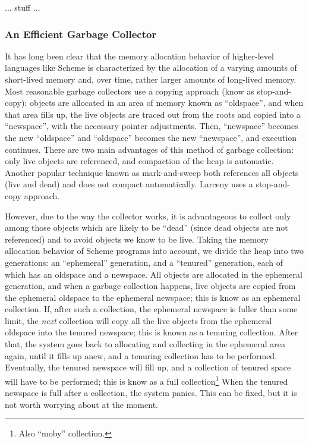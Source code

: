 ... stuff ...

\subsubsection{An Efficient Garbage Collector}

It has long been clear that the memory allocation behavior of
higher-level languages like Scheme is characterized by the allocation
of a varying amounts of short-lived memory and, over time, rather
larger amounts of long-lived memory. Most reasonable garbage
collectors use a copying approach (know as stop-and-copy): objects are
allocated in an area of memory known as ``oldspace'', and when that
area fills up, the live objects are traced out from the roots and
copied into a ``newspace'', with the necessary pointer adjustments.
Then, ``newspace'' becomes the new ``oldspace'' and ``oldspace''
becomes the new ``newspace'', and execution continues. There are two
main advantages of this method of garbage collection: only live
objects are referenced, and compaction of the heap is automatic.
Another popular technique known as mark-and-sweep both references all
objects (live and dead) and does not compact automatically.
Larceny uses a stop-and-copy approach.

However, due to the way the collector works, it is advantageous to
collect only among those objects which are likely to be ``dead''
(since dead objects are not referenced) and to avoid objects we know
to be live. Taking the memory allocation behavior of Scheme programs
into account, we divide the heap into two generations: an
``ephemeral'' generation, and a ``tenured'' generation, each of which
has an oldspace and a newspace. All objects are allocated in the
ephemeral generation, and when a garbage collection happens, live
objects are copied from the ephemeral oldspace to the ephemeral
newspace; this is know as an ephemeral collection. If, after such a
collection, the ephemeral newspace is fuller than some limit, the {\em
next} collection will copy all the live objects from the ephemeral
oldspace into the tenured newspace; this is known as a tenuring
collection. After that, the system goes back to allocating and
collecting in the ephemeral area again, until it fills up anew, and a
tenuring collection has to be performed.  Eventually, the tenured
newspace will fill up, and a collection of tenured space will have to
be performed; this is know as a full collection\footnote{Also ``moby''
collection.} When the tenured newspace is full after a collection,
the system panics. This can be fixed, but it is not worth 
worrying about at the moment.

